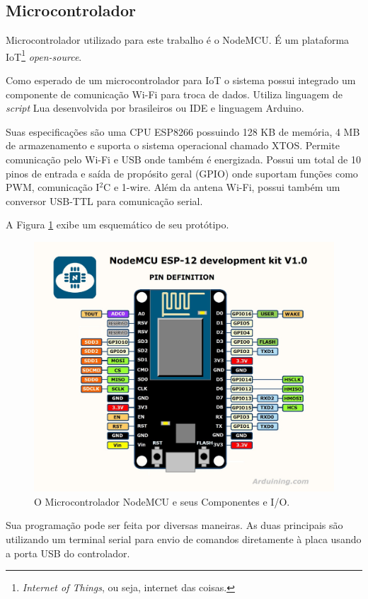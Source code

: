 \documentclass[portugues, brazil, a4paper,12pt]{article}
\begin{document}
	\subsection{Microcontrolador}
		Microcontrolador utilizado para este trabalho é o NodeMCU. É um plataforma IoT\footnote{\textit{Internet of Things}, ou seja, internet das coisas.} \textit{open-source}.

		Como esperado de um microcontrolador para IoT o sistema possui integrado um componente de comunicação Wi-Fi para troca de dados. Utiliza linguagem de \textit{script} Lua desenvolvida por brasileiros ou IDE e linguagem Arduino.

		Suas especificações são uma CPU ESP8266 possuindo 128 KB de memória, 4 MB de armazenamento e suporta o sistema operacional chamado XTOS. Permite comunicação pelo Wi-Fi e USB onde também é energizada. Possui um total de 10 pinos de entrada e saída de propósito geral (GPIO) onde suportam funções como PWM, comunicação I$ ^2 $C e 1-wire. Além da antena Wi-Fi, possui também um conversor USB-TTL para comunicação serial.

		A Figura \ref{fig:eq-nodemcu} exibe um esquemático de seu protótipo.

		\begin{figure}[h]
			\centering
			\includegraphics[width=0.99\linewidth]{img/elementos-nodemcu.jpg}
			\caption{O Microcontrolador NodeMCU e seus Componentes e I/O.}
			\label{fig:eq-nodemcu}
		\end{figure}

		Sua programação pode ser feita por diversas maneiras. As duas principais são utilizando um terminal serial para envio de comandos diretamente à placa usando a porta USB do controlador.
\end{document}
